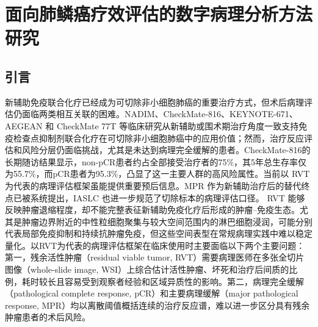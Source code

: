 \chapter{面向肺鳞癌疗效评估的数字病理分析方法研究}

\section{引言}
新辅助免疫联合化疗已经成为可切除非小细胞肺癌的重要治疗方式，但术后病理评估仍面临两类相互关联的困难。NADIM、CheckMate-816、KEYNOTE-671、AEGEAN 和 CheckMate 77T 等临床研究从新辅助或围术期治疗角度一致支持免疫检查点抑制剂联合化疗在可切除非小细胞肺癌中的应用价值\cite{provencio2020nadim,forde2022checkmate816,wakelee2023keynote671,heymach2023aegean,cascone2024checkmate77t}；然而，治疗反应评估和风险分层仍面临挑战，尤其是未达到病理完全缓解的患者。CheckMate-816的长期随访结果显示，non-pCR患者约占全部接受治疗者的75\%，其5年总生存率仅为55.7\%，而pCR患者为95.3\%，凸显了这一主要人群的高风险属性。当前以 RVT 为代表的病理评估框架虽能提供重要预后信息。MPR 作为新辅助治疗后的替代终点已被系统提出，IASLC 也进一步规范了切除标本的病理评估口径\cite{hellmann2014mpr,travis2020iaslc}。
RVT 能够反映肿瘤退缩程度，却不能完整表征新辅助免疫化疗后形成的肿瘤--免疫生态。尤其是肿瘤边界附近的中性粒细胞聚集与较大空间范围内的淋巴细胞浸润，可能分别代表局部免疫抑制和持续抗肿瘤免疫，但这些空间表型在常规病理实践中难以稳定量化。以RVT为代表的病理评估框架在临床使用时主要面临以下两个主要问题：
第一，残余活性肿瘤（residual viable tumor, RVT）需要病理医师在多张全切片图像（whole-slide image, WSI）上综合估计活性肿瘤、坏死和治疗后间质的比例，耗时较长且容易受到观察者经验和区域异质性的影响。第二，病理完全缓解（pathological complete response, pCR）和主要病理缓解（major pathological response, MPR）均以离散阈值概括连续的治疗反应谱，难以进一步区分具有残余肿瘤患者的术后风险。

